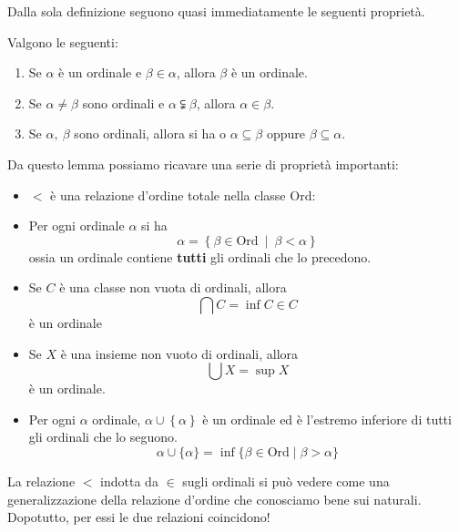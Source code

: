 Dalla sola definizione seguono quasi immediatamente le seguenti proprietà.
\begin{lemmingqed}
	Valgono le seguenti:
\begin{enumerate}
	\item Se $\alpha$ è un ordinale e $\beta\in\alpha$, allora $\beta$ è un ordinale.
	\item Se $\alpha\neq\beta$ sono ordinali e $\alpha\subsetneqq\beta$, allora $\alpha\in\beta$.
	\item Se $\alpha,\ \beta$ sono ordinali, allora si ha o $\alpha\subseteq\beta$ oppure $\beta\subseteq\alpha$.\qedhere
\end{enumerate}
\end{lemmingqed}
Da questo lemma possiamo ricavare una serie di proprietà importanti:
\begin{itemize}
	\item $<$ è una relazione d'ordine totale nella classe $\mathrm{Ord}$:
	\item Per ogni ordinale $\alpha$ si ha
	\begin{equation*}
		\alpha=\left\{\beta\in\mathrm{Ord} \ \middle| \ \beta<\alpha\right\}
	\end{equation*}
ossia un ordinale contiene \textbf{tutti} gli ordinali che lo precedono.
\item Se $C$ è una classe non vuota di ordinali, allora
\begin{equation*}
	\bigcap C=\inf C\in C
\end{equation*}
è un ordinale
\item Se $X$ è una insieme non vuoto di ordinali, allora
\begin{equation*}
	\bigcup X=\sup X
\end{equation*}
è un ordinale.
\item Per ogni $\alpha$ ordinale, $\alpha\cup\left\{\alpha\right\}$ è un ordinale ed è l'estremo inferiore di tutti gli ordinali che lo seguono.
\begin{equation*}
		\alpha\cup\{\alpha\}=\inf\{\beta\in\mathrm{Ord}\mid\beta>\alpha\}
\end{equation*}
\end{itemize}
\begin{intuit}
	La relazione $<$ indotta da $\in$ sugli ordinali si può vedere come una generalizzazione della relazione d'ordine che conosciamo bene sui naturali. Dopotutto, per essi le due relazioni coincidono!
\end{intuit}
